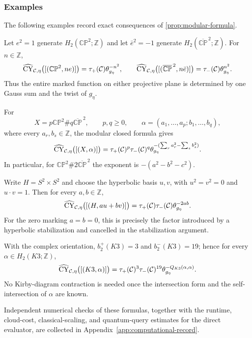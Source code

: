 \subsubsection{Examples}
\label{subsubsec:modular-examples}

The following examples record exact consequences of
\cref{prop:modular-formula}.
\par\medskip

\begin{example}
\label{ex:projective-planes}
Let $e^2=1$ generate $H_2(\mathbb{CP}^2;\mathbb Z)$ and let
$\bar e^2=-1$ generate $H_2(\overline{\mathbb{CP}}^{\,2};\mathbb Z)$.  For
$n\in\mathbb Z$,
\[
  \widehat{\operatorname{CY}}_{\mathcal{C},\eta}\bigl([(\mathbb{CP}^2,ne)]\bigr)
    =\tau_+(\mathcal{C})\theta_{g_\eta}^{-n^2},
  \qquad
  \widehat{\operatorname{CY}}_{\mathcal{C},\eta}\bigl([(\overline{\mathbb{CP}}^{\,2},n\bar e)]\bigr)
    =\tau_-(\mathcal{C})\theta_{g_\eta}^{n^2}.
\]
Thus the entire marked function on either projective plane is determined by
one Gauss sum and the twist of $g_\eta$.
\end{example}

\begin{example}
\label{ex:diagonal-rational-surfaces}
For
\[
 X=p\mathbb{CP}^2\#q\overline{\mathbb{CP}}^{\,2},
 \qquad p,q\geq0,
 \qquad
 \alpha=(a_1,\ldots,a_p;b_1,\ldots,b_q),
\]
where every \(a_r,b_s\in\mathbb Z\),
the modular closed formula gives
\[
 \widehat{\operatorname{CY}}_{\mathcal{C},\eta}\bigl([(X,\alpha)]\bigr)
 =\tau_+(\mathcal{C})^p\tau_-(\mathcal{C})^q
  \theta_{g_\eta}^{-
    (\sum_r a_r^2-\sum_s b_s^2)}.
\]
In particular, for $\mathbb{CP}^2\#2\overline{\mathbb{CP}}^{\,2}$ the
exponent is $-(a^2-b^2-c^2)$.
\end{example}

\begin{example}
\label{ex:s2xs2}
Write $H=S^2\times S^2$ and choose the hyperbolic basis $u,v$, with
$u^2=v^2=0$ and $u\cdot v=1$.  Then
for every \(a,b\in\mathbb Z\),
\[
  \widehat{\operatorname{CY}}_{\mathcal{C},\eta}\bigl([(H,au+bv)]\bigr)
  =\tau_+(\mathcal{C})\tau_-(\mathcal{C})\theta_{g_\eta}^{-2ab}.
\]
For the zero marking $a=b=0$, this is precisely the factor introduced by a
hyperbolic stabilization and cancelled in the stabilization argument.
\end{example}

\begin{example}[$K3$]
\label{ex:k3-modular}
With the complex orientation, $b_2^+(K3)=3$ and $b_2^-(K3)=19$; hence
for every \(\alpha\in H_2(K3;\mathbb Z)\),
\[
  \widehat{\operatorname{CY}}_{\mathcal{C},\eta}\bigl([(K3,\alpha)]\bigr)
  =\tau_+(\mathcal{C})^3\tau_-(\mathcal{C})^{19}
   \theta_{g_\eta}^{-Q_{K3}(\alpha,\alpha)}.
\]
No Kirby-diagram contraction is needed once the intersection form and the
self-intersection of $\alpha$ are known.
\end{example}

Independent numerical checks of these formulas, together with the
runtime, cloud-cost, classical-scaling, and quantum-query estimates for the
direct evaluator, are collected in
Appendix~\ref{app:computational-record}.
